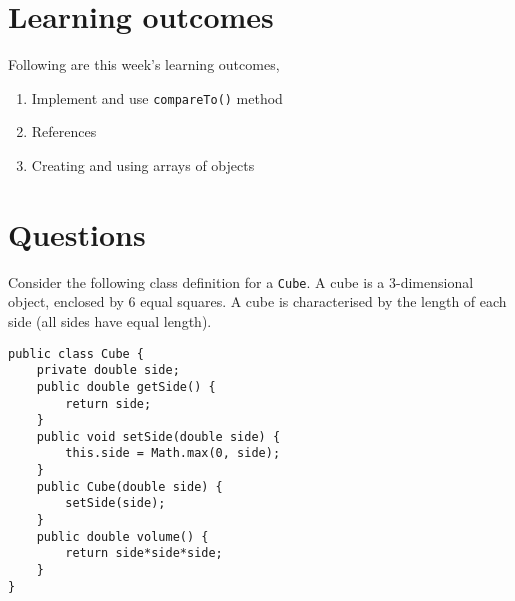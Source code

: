 
\section*{Learning outcomes}
Following are this week's learning outcomes,
\begin{enumerate}
\item Implement and use \texttt{compareTo()} method
\item References
\item Creating and using arrays of objects
\end{enumerate}

\section*{Questions}
\begin{questions}

\question 

Consider the following class definition for a \texttt{Cube}. A cube is a 3-dimensional object, enclosed by 6 equal squares. A cube is characterised by the length of each side (all sides have equal length).

\begin{lstlisting}
public class Cube {
	private double side;
	public double getSide() {
		return side;
	}
	public void setSide(double side) {
		this.side = Math.max(0, side);
	}
	public Cube(double side) {
		setSide(side);
	}
	public double volume() {
		return side*side*side;
	}
}
\end{lstlisting}

\end{questions}
